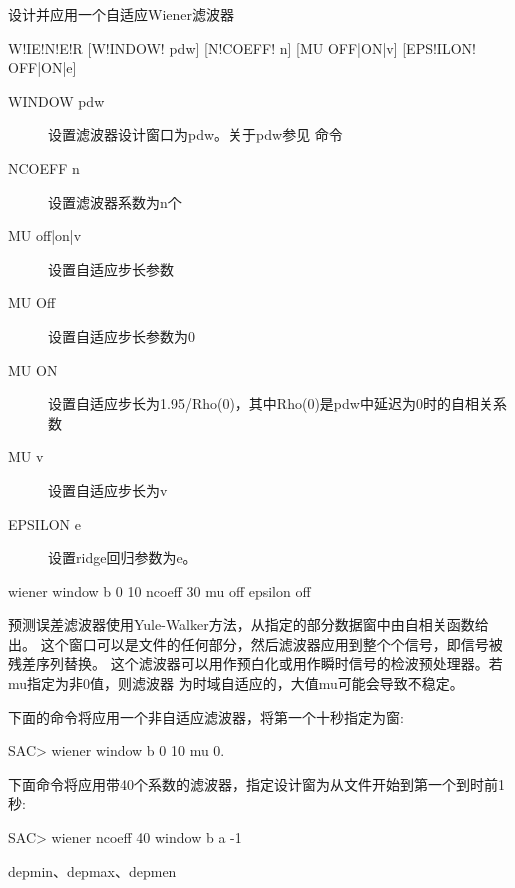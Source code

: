 \label{cmd:wiener}

设计并应用一个自适应Wiener滤波器

\begin{SACSTX}
W!IE!N!E!R [W!INDOW! pdw] [N!COEFF! n] [MU OFF|ON|v] [EPS!ILON! OFF|ON|e]
\end{SACSTX}

\begin{description}
\item [WINDOW pdw] 设置滤波器设计窗口为pdw。关于pdw参见  命令
\item [NCOEFF n] 设置滤波器系数为n个
\item [MU off|on|v] 设置自适应步长参数
\item [MU Off] 设置自适应步长参数为0
\item [MU ON] 设置自适应步长为1.95/Rho(0)，其中Rho(0)是pdw中延迟为0时的自相关系数
\item [MU v] 设置自适应步长为v
\item [EPSILON e] 设置ridge回归参数为e。
\end{description}

\begin{SACDFT}
wiener window b 0 10 ncoeff 30 mu off epsilon off
\end{SACDFT}

预测误差滤波器使用Yule-Walker方法，从指定的部分数据窗中由自相关函数给出。
这个窗口可以是文件的任何部分，然后滤波器应用到整个个信号，即信号被残差序列替换。
这个滤波器可以用作预白化或用作瞬时信号的检波预处理器。若mu指定为非0值，则滤波器
为时域自适应的，大值mu可能会导致不稳定。

下面的命令将应用一个非自适应滤波器，将第一个十秒指定为窗:
\begin{SACCode}
SAC> wiener window b 0 10 mu 0.
\end{SACCode}

下面命令将应用带40个系数的滤波器，指定设计窗为从文件开始到第一个到时前1秒:
\begin{SACCode}
SAC> wiener ncoeff 40 window b a -1
\end{SACCode}

depmin、depmax、depmen
